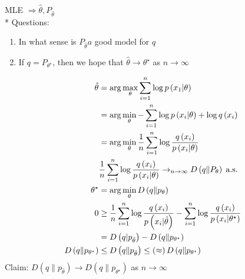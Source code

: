 \documentclass{article}
\begin{document}
MLE $\Rightarrow  \hat{\theta}, P_{\hat{\theta}}$
\\* Questions:
\begin{enumerate}
\item In what sense is $P_{\hat{\theta}} a$ good model for $q $
\item If $q  = P_{\theta^\star }$, then we hope that $\hat{\theta} \to  \theta^\star $ as $n  \to  \infty$
\end{enumerate}

\begin{align*}
\hat{\theta} &= \arg\displaystyle\max_{\theta} \displaystyle\sum_{i=1}^{n} \log p\left(x_{1} | \theta\right)
\\ &= \arg\displaystyle\min_{\theta} - \displaystyle\sum_{i=1}^{n} \log p\left(x_{i} | \theta\right) + \log q\left(x_{i}\right)
\\ &= \arg\displaystyle\min_{\theta} \dfrac{1}{n} \displaystyle\sum_{i=1}^{n} \log \dfrac{q\left(x_{i}\right)}{p\left(x_{i} | \theta\right)}
\\ &  \dfrac{1}{n} \displaystyle\sum_{i=1}^{n} \log \dfrac{q\left(x_{i}\right)}{p\left(x_{i} | \theta\right)} \to _{n \to  \infty}  D\left(q \| P_{\theta}\right)  \text{\;a.s.\;}
\\ \theta^\star  &= \arg\displaystyle\min_{\theta} D\left(q \| p_{\theta}\right)
\\ 0 &\geq  \dfrac{1}{n} \displaystyle\sum_{i=1}^{n} \log \dfrac{q\left(x_{i}\right)}{p\left(x_{i} | \hat{\theta}\right)} - \displaystyle\sum_{i=1}^{n} \log \dfrac{q\left(x_{i}\right)}{p\left(x_{i} | \theta^\star \right)}
\\ &= D\left(q | p_{\hat{\theta}}\right) - D\left(q \| p_{\theta^\star }\right)
\\ D\left(q \| p_{\theta^\star }\right)  &\leq  D\left(q \| p_{\hat{\theta}}\right) \leq \left(\approx\right) D\left(q \| p_{\theta^\star }\right)
\end{align*}
Claim: $D\left(q \| p_{\hat{\theta}}\right)  \to  D\left(q \| p_{\theta^\star }\right) $ as $n  \to  \infty$
\end{document}
